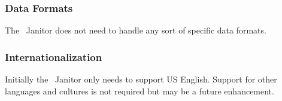 \subsubsection*{Data Formats}

The \VTank\ Janitor does not need to handle any sort of specific data formats.

\subsubsection*{Internationalization}

Initially the \VTank\ Janitor only needs to support US English. Support for other languages and cultures is not required but may be a future enhancement.

